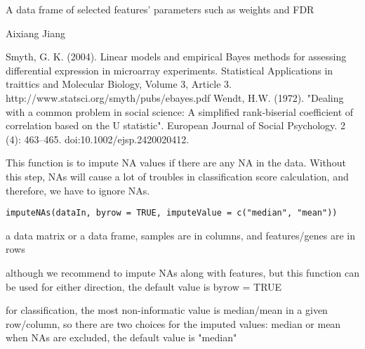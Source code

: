 \documentclass[letterpaper]{book}
\begin{document}
%
\begin{Value}
A data frame of selected features' parameters such as weights and FDR
\end{Value}
%
\begin{Author}\relax
Aixiang Jiang
\end{Author}
%
\begin{References}\relax
Smyth, G. K. (2004). Linear models and empirical Bayes methods for assessing differential expression in microarray experiments. 
Statistical Applications in traittics and Molecular Biology, Volume 3, Article 3. http://www.statsci.org/smyth/pubs/ebayes.pdf
Wendt, H.W. (1972). "Dealing with a common problem in social science: A simplified rank-biserial coefficient of correlation 
based on the U statistic". European Journal of Social Psychology. 2 (4): 463–465. doi:10.1002/ejsp.2420020412.
\end{References}
%
\begin{Description}\relax
This function is to impute NA values if there are any NA in the data. 
Without this step, NAs will cause a lot of troubles in classification score calculation, and therefore, we have to ignore NAs.
\end{Description}
%
\begin{Usage}
\begin{verbatim}
imputeNAs(dataIn, byrow = TRUE, imputeValue = c("median", "mean"))
\end{verbatim}
\end{Usage}
%
\begin{Arguments}
\begin{ldescription}
\item[\code{dataIn}] a data matrix or a data frame, samples are in columns, and features/genes are in rows

\item[\code{byrow}] although we recommend to impute NAs along with features, but this function can be used for either direction,
the default value is byrow = TRUE

\item[\code{imputeValue}] for classification, the most non-informatic value is median/mean in a given row/column, 
so there are two choices for the imputed values: median or mean when NAs are excluded, the default value is "median"
\end{ldescription}
\end{Arguments}
\end{document}
